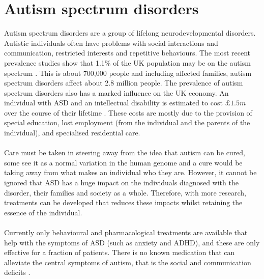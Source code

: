 \documentclass{epsrc}
\begin{document}
\section{Autism spectrum disorders}
\noindent
Autism spectrum disorders are a group of lifelong neurodevelopmental disorders. Autistic individuals often have problems with social interactions and communication, restricted interests and repetitive behaviours. The most recent prevalence studies show that 1.1\% of the UK population may be on the autism spectrum \cite{brugha2012estimating}. This is about 700,000 people and including affected families, autism spectrum disorders affect about 2.8 million people. The prevalence of autism spectrum disorders also has a marked influence on the UK economy. An individual with ASD and an intellectual disability is estimated to cost $ \pounds 1.5m $ over the course of their lifetime \cite{buescher2014costs}. These costs are mostly due to the provision of special education, lost employment (from the individual and the parents of the individual), and specialised residential care. 
\\\\
Care must be taken in steering away from the idea that autism can be cured, some see it as a normal variation in the human genome and a cure would be taking away from what makes an individual who they are. However, it cannot be ignored that ASD has a huge impact on the individuals diagnosed with the disorder, their families and society as a whole. Therefore, with more research, treatments can be developed that reduces these impacts whilst retaining the essence of the individual.
\\\\
Currently only behavioural and pharmacological treatments are available that help with the symptoms of ASD (such as anxiety and ADHD), and these are only effective for a fraction of patients. There is no known medication that can alleviate the central symptoms of autism, that is the social and communication deficits \cite{buitelaar2003have}.
\\
\end{document}
